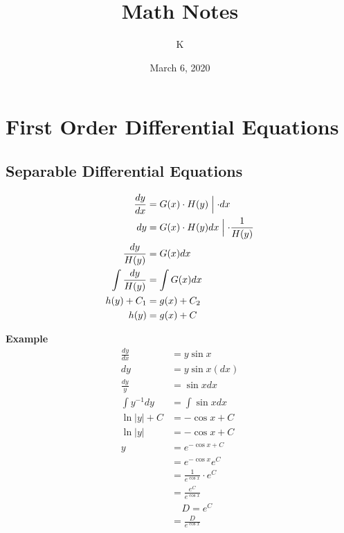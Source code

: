 \documentclass[10pt, letterpaper]{article}
\title{Math Notes}
\author{K}
\date{March 6, 2020}
\begin{document}
\begin{comment}
\begin{titlepage}
    \maketitle
\end{titlepage}
\end{comment}

\maketitle

\tableofcontents{}
\section{First Order Differential Equations}
\subsection{Separable Differential Equations}

\begin{align*}
\frac{dy}{dx} &= G(x) \cdot H(y) \Bigm\lvert \cdot dx\\
dy &= G(x) \cdot H(y) dx \Bigm\lvert \cdot \frac{1}{H(y)}\\
\frac{dy}{H(y)} &= G(x) dx\\
\int \limits \frac{dy}{H(y)} &= \int \limits G(x) dx\\
h(y) + C_1 &= g(x) + C_2\\
h(y) &= g(x) + C
\end{align*}

\textbf{Example}
\begin{align*}
\frac{dy}{dx} &= y \sin x\\
dy &= y \sin x (dx)\\
\frac{dy}{y} &= \sin x dx\\
\int \limits y^{-1} dy &= \int \limits \sin x dx\\
\ln |y| + C &= -\cos x + C\\
\ln |y| &= -\cos x + C\\
y &= e^{-\cos x + C}\\
&= e^{-\cos x}e^C\\
&= \frac{1}{e^{\cos x}} \cdot e^C\\
&= \frac{e^C}{e^{\cos x}}\\
& ~~~~~ D = e^C\\
&= \frac{D}{e^{\cos x}}
\end{align*}
\end{document}
